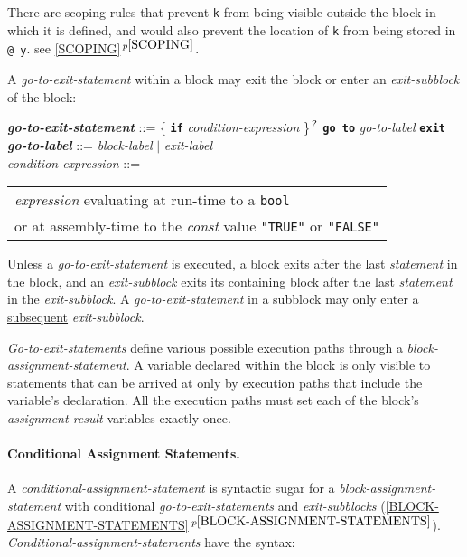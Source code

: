 \documentclass[12pt]{article}
\newcommand{\subsubsubsection}[1]{\paragraph[#1]{#1.}}
\newcommand{\TT}[1]{{\tt \bfseries #1}}
\newcommand{\QMARK}{{$^{\,\mbox{\footnotesize ?}}$}}
\newcommand{\ttkey}[1]{{\tt \bfseries #1}}
\newcommand{\emkey}[1]{{\em \bfseries #1}}
\newcommand{\itemref}[1]{\ref{#1}$\,^{p\pageref{#1}}$}
\newenvironment{indpar}[1][0.3in]%
	{\begin{list}{}%
		     {\setlength{\itemsep}{0in}%
		      \setlength{\topsep}{0in}%
		      \setlength{\parsep}{1ex}%
		      \setlength{\labelwidth}{#1}%
		      \setlength{\leftmargin}{#1}%
		      \addtolength{\leftmargin}{\labelsep}}%
	 \item}%
	{\end{list}}
\begin{document}
There are scoping rules that prevent {\tt k} from being visible
outside the block in which it is defined, and would also
prevent the location of {\tt k} from being stored in {\tt @ y}.
see \itemref{SCOPING}.

A {\em go-to-exit-statement} within a block may exit the block or
enter an {\em exit-subblock} of the block:
\begin{indpar}
\emkey{go-to-exit-statement}\label{GO-TO-STATEMENT} ::=
    \{ \TT{if} {\em condition-expression} \}\QMARK{}
    \ttkey{go to} {\em go-to-label} \TT{exit}
\\[0.5ex]
\emkey{go-to-label} ::= {\em block-label} $|$ {\em exit-label}
\\[0.5ex]
{\em condition-expression} ::=
    \begin{tabular}[t]{@{}l}
    {\em expression} evaluating at run-time to a {\tt bool} \\
    or at assembly-time to the {\em const} value {\tt "TRUE"} or {\tt "FALSE"}
    \end{tabular}
\end{indpar}

Unless a {\em go-to-exit-statement} is executed,
a block exits after the last {\em statement} in the block,
and an {\em exit-subblock} exits its containing block after the last
{\em statement} in the {\em exit-subblock}.
A {\em go-to-exit-statement} in a subblock may only enter
a \underline{subsequent} {\em exit-subblock}.

{\em Go-to-exit-statements} define various possible execution
paths through a {\em block-assignment-statement}.
A variable declared within the block is only visible to statements that can be
arrived at only by execution paths that include the variable's
declaration.  All the execution paths must set each of the
block's {\em assignment-result} variables exactly once.


\subsubsubsection{Conditional Assignment Statements}
\label{CONDITIONAL-ASSIGNMENT-STATEMENTS}

A {\em conditional-assignment-statement}
is syntactic sugar for a {\em block-assignment-statement}
with conditional {\em go-to-exit-statements}
and {\em exit-subblocks} (\itemref{BLOCK-ASSIGNMENT-STATEMENTS}).
{\em Conditional-assignment-statements} have the syntax:
\end{document}
